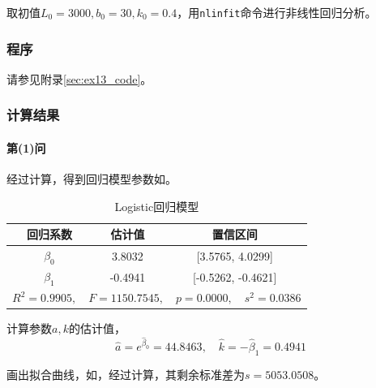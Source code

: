取初值$L_0=3000, b_0=30, k_0=0.4$，用\texttt{nlinfit}命令进行非线性回归分析。

\subsubsection{程序}

请参见附录\ref{sec:ex13_code}。

\subsubsection{计算结果}

\paragraph{第(1)问} 经过计算，得到回归模型参数如。

\begin{table}[H]
    \centering
    \caption{Logistic回归模型}
    \label{tab:ex13_logistic_linear}
    \begin{tabular}{|c|c|c|}
        \hline
        回归系数 & 估计值 & 置信区间\\
        \hline
        \hline
        \(\beta_0\) & 3.8032 & [3.5765, 4.0299]\\
        \hline
        \(\beta_1\) & -0.4941 & [-0.5262, -0.4621]\\
        \hline
        \multicolumn{3}{|c|}{$R^2=0.9905, \quad F=1150.7545, \quad p=0.0000, \quad s^2=0.0386$}\\
        \hline
    \end{tabular}
\end{table}

计算参数$a,k$的估计值，
\begin{equation}
    \hat{a} = e^{\hat{\beta}_0} = 44.8463, \quad \hat{k} = -\hat{\beta}_1 = 0.4941
\end{equation}

画出拟合曲线，如，经过计算，其剩余标准差为$s=5053.0508$。

